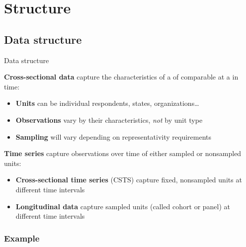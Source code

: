 \documentclass{beamer}
\begin{document}
	\section{Structure}

	\subsection{Data structure}
	
	\begin{frame}[t]{Data structure}

	\textbf{Cross-sectional data} capture the characteristics of a  of comparable  at a  in time:

	\begin{itemize}
		\item \textbf{Units} can be individual respondents, states, organizations…
		\item \textbf{Observations} vary by their characteristics, \textit{not} by unit type
		\item \textbf{Sampling} will vary depending on representativity requirements
	\end{itemize}
		
	\textbf{Time series} capture  observations over time of either sampled or nonsampled units:

	\begin{itemize}
		\item \textbf{Cross-sectional time series} (CSTS) capture fixed, nonsampled units at different time intervals
		\item \textbf{Longitudinal data} capture sampled units (called cohort or panel) at different time intervals
	\end{itemize}

	\end{frame}
	
	\subsubsection{Example}
	
\end{document}
